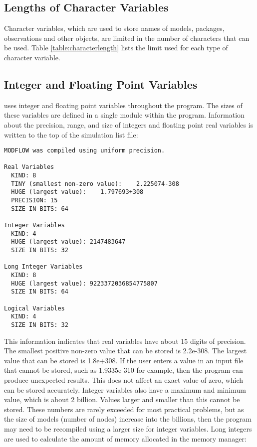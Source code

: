 \subsection{Lengths of Character Variables}
Character variables, which are used to store names of models, packages, observations and other objects, are limited in the number of characters that can be used. Table \ref{table:characterlength} lists the limit used for each type of character variable.

\FloatBarrier

\FloatBarrier

\subsection{Integer and Floating Point Variables}
\mf uses integer and floating point variables throughout the program.  The sizes of these variables are defined in a single module within the program.  Information about the precision, range, and size of integers and floating point real variables is written to the top of the simulation list file: 

{\small
\begin{lstlisting}[style=modeloutput]
MODFLOW was compiled using uniform precision.

Real Variables
  KIND: 8
  TINY (smallest non-zero value):    2.225074-308
  HUGE (largest value):    1.797693+308
  PRECISION: 15
  SIZE IN BITS: 64

Integer Variables
  KIND: 4
  HUGE (largest value): 2147483647
  SIZE IN BITS: 32

Long Integer Variables
  KIND: 8
  HUGE (largest value): 9223372036854775807
  SIZE IN BITS: 64

Logical Variables
  KIND: 4
  SIZE IN BITS: 32
\end{lstlisting}
}

This information indicates that real variables have about 15 digits of precision.  The smallest positive non-zero value that can be stored is 2.2e-308.  The largest value that can be stored is 1.8e+308.  If the user enters a value in an input file that cannot be stored, such as 1.9335e-310 for example, then the program can produce unexpected results.  This does not affect an exact value of zero, which can be stored accurately.  Integer variables also have a maximum and minimum value, which is about 2 billion.  Values larger and smaller than this cannot be stored.  These numbers are rarely exceeded for most practical problems, but as the size of models (number of nodes) increase into the billions, then the program may need to be recompiled using a larger size for integer variables. Long integers are used to calculate the amount of memory allocated in the memory manager:

